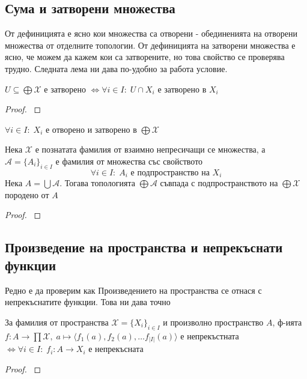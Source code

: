 \subsection{Сума и затворени множества}
От дефиницията е ясно кои множества са отворени - обединенията на отворени множества от отделните топологии. От дефиницията на затворени множества е ясно, че можем да кажем кои са затворените, но това свойство се проверява трудно. Следната лема ни дава по-удобно за работа условие.
\begin{lemma}
    $U \subseteq \bigoplus \mathcal X$ е затворено $\iff \forall i \in I:\; U \cap X_i$ е затворено в $X_i$
\end{lemma}
\begin{proof}
    \cite[p.~74]{engelking1989general}
\end{proof}

\begin{corollary}
    $\forall i \in I:\; X_i$ е отворено и затворено в $\bigoplus \mathcal X$
\end{corollary}
\begin{proposition}
    Нека $\mathcal X$ е познатата фамилия от взаимно непресичащи се множества, а $\mathcal A = \{A_i\}_{i \in I}$ е фамилия от множества със свойството
    \begin{equation*}
        \forall i\in I:\; A_i \text{ е подпространство на } X_i
    \end{equation*}
    Нека $A = \bigcup \mathcal A$. Тогава топологията $\bigoplus \mathcal A$ съвпада с подпространството на $\bigoplus \mathcal X$ породено от $A$
\end{proposition}
\begin{proof}
    \cite[p.~75]{engelking1989general}
\end{proof}

\subsection{Произведение на пространства и непрекъснати функции}
Редно е да проверим как Произведението на пространства се отнася с непрекъснатите функции. Това ни дава точно 
\begin{theorem}\label{th:sum-continuous}
    За фамилия от пространства $\mathcal X = \{X_i\}_{i \in I}$ и произволно пространство $A$, ф-ията $f : A \to \prod \mathcal X,\; a \mapsto \langle f_1(a), f_2(a), \dots f_{|I|}(a) \rangle$ е непрекъстната $\iff \forall i \in I:\; f_i: A \to X_i$ е непрекъсната
\end{theorem}
\begin{proof}
    \cite[p.~110]{munkrestopology}
\end{proof}
